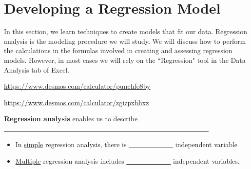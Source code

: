 \documentclass[12pt, letterpaper]{article}
\newcounter{visualconnection}
\theoremstyle{definition}
\begin{document}
\newpage

\section*{Developing a Regression Model}

\noindent In this section, we learn techniques to create models that fit our data.  Regression analysis is the modeling procedure we will study.  We will discuss how to perform the calculations in the formulas involved in creating and assessing regression models.  However, in most cases we will rely on the ``Regression" tool in the Data Analysis tab of Excel.

\vspace*{.1in}

\begin{visualconnection}

\begin{center}
\vspace*{.15in}

\href{https://www.desmos.com/calculator/punehfo8by}{https://www.desmos.com/calculator/punehfo8by}
\end{center}

\vspace*{.15in}

\begin{center}
\href{https://www.desmos.com/calculator/zgizpxbhxz}{https://www.desmos.com/calculator/zgizpxbhxz}

\vspace*{.15in}

\end{center}

\end{visualconnection}

\vspace*{.1in}

\noindent \textbf{Regression analysis} enables us to describe \underline{~~~~~~~~~~~~~~~~~~~~~~~~~~~~~~~~~~~~~~~~~~~~~~~~~~~~~~~~~~~~}

\begin{itemize}
\item In \underline{simple} regression analysis, there is \underline{~~~~~~~~~~~~~} independent variable
\vspace*{.1in}
\item \underline{Multiple} regression analysis includes \underline{~~~~~~~~~~~~~} independent variables.
\vspace*{.1in}
\end{itemize}
\end{document}
